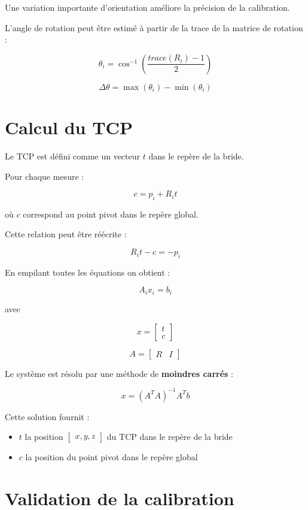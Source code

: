\documentclass[a4paper,11pt]{article}
\begin{document}
Une variation importante d’orientation améliore la précision de la calibration.

L’angle de rotation peut être estimé à partir de la trace de la matrice de rotation :

\[
\theta_i = \cos^{-1}\left(\frac{trace(R_i)-1}{2}\right)
\]

\[
\Delta\theta = \max(\theta_i) - \min(\theta_i)
\]

\section{Calcul du TCP}

Le TCP est défini comme un vecteur $t$ dans le repère de la bride.

Pour chaque mesure :

\[
c = p_i + R_i t
\]

où $c$ correspond au point pivot dans le repère global.

Cette relation peut être réécrite :

\[
R_i t - c = -p_i
\]

En empilant toutes les équations on obtient :

\[
A_i x_i = b_i
\]

avec

\[
x =
\begin{bmatrix}
t \\
c
\end{bmatrix}
\]

\[
A =
\begin{bmatrix}
R & I
\end{bmatrix}
\]

Le système est résolu par une méthode de \textbf{moindres carrés} :

\[
x = (A^TA)^{-1}A^Tb
\]

Cette solution fournit :

\begin{itemize}
\item $t$ la position $
\begin{bmatrix}
    x,y,z
\end{bmatrix}
$ du TCP dans le repère de la bride
\item $c$ la position du point pivot dans le repère global
\end{itemize}

\newpage
\section{Validation de la calibration}
\end{document}
